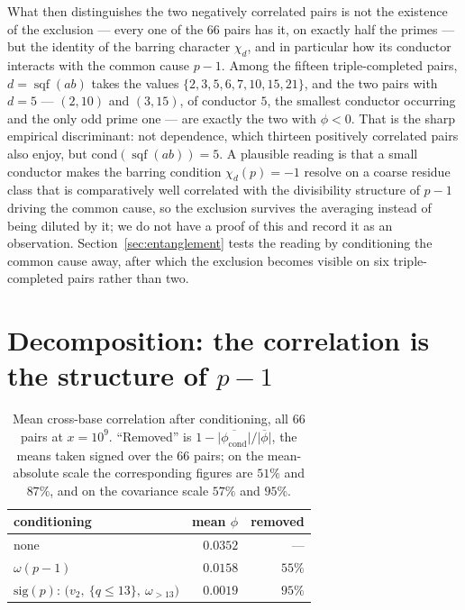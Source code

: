 \documentclass[11pt,reqno]{amsart}
\theoremstyle{plain}
\theoremstyle{definition}
\DeclareMathOperator{\sqf}{sqf}
\begin{document}
What then distinguishes the two negatively correlated pairs is not the
existence of the exclusion --- every one of the $66$ pairs has it, on exactly
half the primes --- but the identity of the barring character $\chi_d$, and in
particular how its conductor interacts with the common cause $p-1$. Among the
fifteen triple-completed pairs, $d = \sqf(ab)$ takes the values
$\{2, 3, 5, 6, 7, 10, 15, 21\}$, and the two pairs with $d = 5$ ---
$(2,10)$ and $(3,15)$, of conductor $5$, the smallest conductor occurring and
the only odd prime one --- are exactly the two with $\phi < 0$. That is the
sharp empirical discriminant: not dependence, which thirteen positively
correlated pairs also enjoy, but $\mathrm{cond}(\sqf(ab)) = 5$. A plausible
reading is that a small conductor makes the barring condition
$\chi_d(p) = -1$ resolve on a coarse residue class that is comparatively well
correlated with the divisibility structure of $p-1$ driving the common cause,
so the exclusion survives the averaging instead of being diluted by it; we do
not have a proof of this and record it as an observation.
Section~\ref{sec:entanglement} tests the reading by conditioning the common
cause away, after which the exclusion becomes visible on six triple-completed pairs rather than two.




\section{Decomposition: the correlation is the structure of \texorpdfstring{$p-1$}{p-1}}
\label{sec:decomposition_crossbase}

\begin{table}[t]
\centering
\caption{Mean cross-base correlation after conditioning, all $66$ pairs at
$x = 10^9$. ``Removed'' is
$1 - \lvert\overline{\phi_{\mathrm{cond}}}\rvert / \lvert\overline{\phi}\rvert$,
the means taken signed over the $66$ pairs; on the mean-absolute scale the
corresponding figures are $51\%$ and $87\%$, and on the covariance scale
$57\%$ and $95\%$.}
\label{tab:decomp_crossbase}
\begin{tabular}{lrr}
\toprule
conditioning & mean $\phi$ & removed \\
\midrule
none & $0.0352$ & --- \\
$\omega(p-1)$ & $0.0158$ & $55\%$ \\
$\mathrm{sig}(p)$: $\bigl(v_2,\ \{q \le 13\},\ \omega_{>13}\bigr)$
  & $0.0019$ & $95\%$ \\
\bottomrule
\end{tabular}
\end{table}
\end{document}
